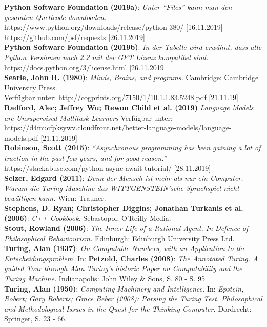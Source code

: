 \documentclass[a4paper,10pt]{article}
\begin{document}
\textbf{Python Software Foundation (2019a)}: \textit{Unter \enquote{Files} kann man den gesamten Quellcode downloaden.} \\ https://www.python.org/downloads/release/python-380/ [16.11.2019] \\
https://github.com/psf/requests [26.11.2019] \\
\textbf{Python Software Foundation (2019b)}: \textit{In der Tabelle wird erwähnt, dass alle Python Versionen nach 2.2 mit der GPT Lizenz kompatibel sind.} https://docs.python.org/3/license.html [26.11.2019] \\
\textbf{Searle, John R. (1980)}: \textit{Minds, Brains, and programs.} Cambridge: Cambridge University Press. \\ Verfügbar unter: http://cogprints.org/7150/1/10.1.1.83.5248.pdf [21.11.19]
\textbf{Radford, Alec; Jeffrey Wu; Rewon Child et al. (2019)} \textit{Language Models are Unsupervised Multitask Learners} Verfügbar unter: \\ https://d4mucfpksywv.cloudfront.net/better-language-models/language-models.pdf [21.11.2019] \\
\textbf{Robinson, Scott (2015)}: \textit{\enquote{Asynchronous programming has been gaining a lot of traction in the past few years, and for good reason.}} \\
https://stackabuse.com/python-async-await-tutorial/ [28.11.2019] \\
\textbf{Selzer, Edgard (2011)}: \textit{Denn der Mensch ist mehr als nur ein Computer. Warum die Turing-Maschine das WITTGENSTEIN'sche Sprachspiel nicht bewältigen kann.} Wien: Trauner. \\
\textbf{Stephens, D. Ryan; Christopher Diggins; Jonathan Turkanis et al. (2006)}: \textit{C++ Cookbook.} Sebastopol: O'Reilly Media. \\
\textbf{Stout, Rowland (2006)}: \textit{The Inner Life of a Rational Agent. In Defence of Philosophical Behaviourism.} Edinburgh: Edinburgh University Press Ltd. \\
\textbf{Turing, Alan (1937)}: \textit{On Computable Numbers, with an Application to the Entscheidungsproblem.} In: \textbf{Petzold, Charles (2008)}: \textit{The Annotated Turing. A guided Tour through Alan Turing’s historic Paper on Computability and the Turing Machine.} Indianapolis: John Wiley \& Sons, S. 80 - S. 95 \\
\textbf{Turing, Alan (1950)}: \textit{Computing Machinery and Intelligence.} In: \textit{Epstein, Robert; Gary Roberts; Grace Beber (2008): Parsing the Turing Test.  Philosophical and Methodological Issues in the Quest for the Thinking Computer.} Dordrecht: Springer, S. 23 - 66. \\
\end{document}
